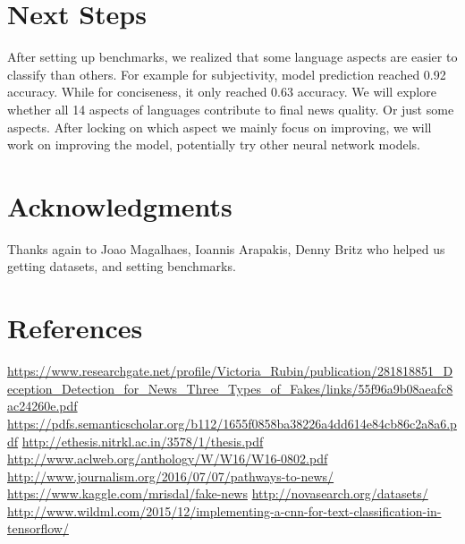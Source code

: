 \documentclass[11pt]{article}
\begin{document}
\section{Next Steps}

After setting up benchmarks, we realized that some language aspects are easier to classify than others. For example for subjectivity, model prediction reached 0.92 accuracy. While for conciseness, it only reached 0.63 accuracy. We will explore whether all 14 aspects of languages contribute to final news quality. Or just some aspects. After locking on which aspect we mainly focus on improving, we will work on improving the model, potentially try other neural network models. 


\section*{Acknowledgments}

Thanks again to Joao Magalhaes, Ioannis Arapakis, Denny Britz who helped us getting datasets, and setting benchmarks. 

\section*{References }

\url{https://www.researchgate.net/profile/Victoria_Rubin/publication/281818851_Deception_Detection_for_News_Three_Types_of_Fakes/links/55f96a9b08aeafc8ac24260e.pdf}
\url{https://pdfs.semanticscholar.org/b112/1655f0858ba38226a4dd614e84cb86c2a8a6.pdf}
\url{http://ethesis.nitrkl.ac.in/3578/1/thesis.pdf}
\url{http://www.aclweb.org/anthology/W/W16/W16-0802.pdf}
\url{http://www.journalism.org/2016/07/07/pathways-to-news/ }
\url{https://www.kaggle.com/mrisdal/fake-news}
\url{http://novasearch.org/datasets/ }
\url{http://www.wildml.com/2015/12/implementing-a-cnn-for-text-classification-in-tensorflow/ }
\end{document}
